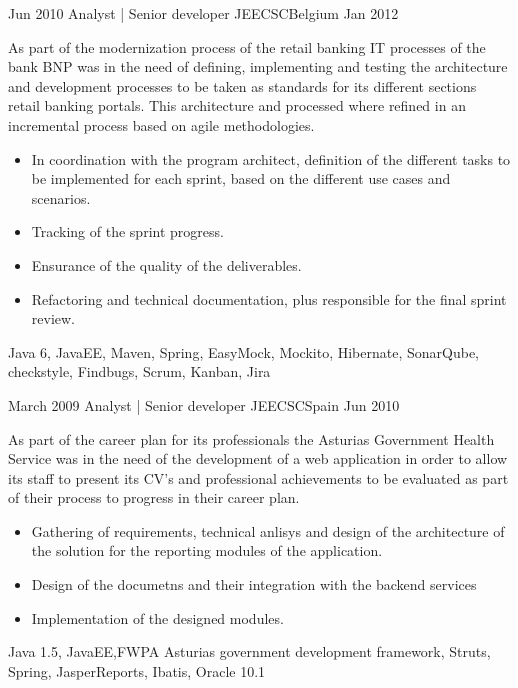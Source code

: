 \begin{experiences}
  \emptySeparator
  
  
  \experience
    {Jun 2010} {Analyst | Senior developer JEE}{CSC}{Belgium}
    {Jan 2012}    {

As part of the modernization process of the retail banking IT processes of the bank BNP was in
the need of defining, implementing and testing the architecture and development processes to be
taken as standards for its different sections retail banking portals. This architecture and
processed where refined in an incremental process based on agile methodologies.  
    	
                      \begin{itemize}
                        \item In coordination with the program architect, definition of the different tasks to be implemented for each sprint, based on the different use cases and scenarios.
                        \item Tracking of the sprint progress.                       
                        \item Ensurance of the quality of the deliverables.
                        \item Refactoring and technical documentation,
plus responsible for the final sprint review.
                      \end{itemize}
                    }
                    {Java 6, JavaEE, Maven, Spring, EasyMock, Mockito, Hibernate, SonarQube, checkstyle, Findbugs, Scrum, Kanban, Jira}
                    
  \emptySeparator
  
  \experience
    {March 2009} {Analyst | Senior developer JEE}{CSC}{Spain}
    {Jun 2010}    {

As part of the career plan for its professionals the Asturias Government Health Service was in
the need of the development of a web application in order to allow its staff to present its CV’s
and professional achievements to be evaluated as part of their process to progress in their career
plan.    
    	
                      \begin{itemize}
                        \item Gathering of requirements, technical anlisys and design of the architecture of the solution for the reporting modules of the application.
                        \item Design of the documetns and their integration with the backend services                       
                        \item Implementation of the designed modules.
                      \end{itemize}
                    }
                    {Java 1.5, JavaEE,FWPA Asturias government development framework,
Struts, Spring, JasperReports, Ibatis, Oracle 10.1}
                    

\end{experiences}
